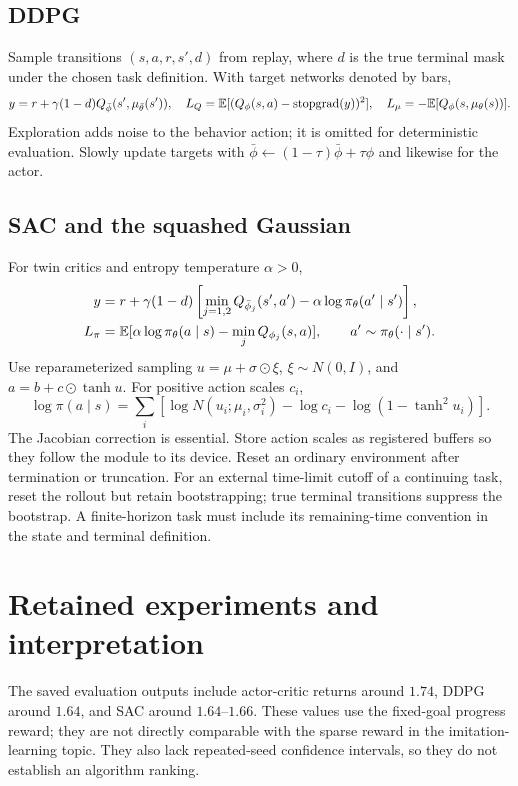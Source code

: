 \subsection{DDPG}
Sample transitions $(s,a,r,s',d)$ from replay, where $d$ is the true terminal
mask under the chosen task definition. With target networks denoted by bars,
\[
 y=r+\gamma(1-d)Q_{\bar\phi}(s',\mu_{\bar\theta}(s')),
 \quad L_Q=\mathbb{E}[(Q_\phi(s,a)-\operatorname{stopgrad}(y))^2],
 \quad L_\mu=-\mathbb{E}[Q_\phi(s,\mu_\theta(s))].
\]
Exploration adds noise to the behavior action; it is omitted for deterministic
evaluation. Slowly update targets with
$\bar\phi\leftarrow(1-\tau)\bar\phi+\tau\phi$ and likewise for the actor.

\subsection{SAC and the squashed Gaussian}
For twin critics and entropy temperature $\alpha>0$,
\begin{align*}
 y&=r+\gamma(1-d)
  \left[\min_{j=1,2}Q_{\bar\phi_j}(s',a')-\alpha\log\pi_\theta(a'\mid s')\right],\\
 L_{\pi}&=\mathbb{E}[\alpha\log\pi_\theta(a\mid s)-\min_jQ_{\phi_j}(s,a)],
 \qquad a'\sim\pi_\theta(\cdot\mid s').
\end{align*}
Use reparameterized sampling $u=\mu+\sigma\odot\xi$, $\xi\sim N(0,I)$,
and $a=b+c\odot\tanh u$. For positive action scales $c_i$,
\[
 \log\pi(a\mid s)=\sum_i\left[
    \log N(u_i;\mu_i,\sigma_i^2)-\log c_i-\log(1-\tanh^2u_i)\right].
\]
The Jacobian correction is essential. Store action scales as registered
buffers so they follow the module to its device. Reset an ordinary environment
after termination or truncation. For an external time-limit cutoff of a
continuing task, reset the rollout but retain bootstrapping; true terminal
transitions suppress the bootstrap. A finite-horizon task must include its
remaining-time convention in the state and terminal definition.

\newpage
\section{Retained experiments and interpretation}
\historical
The saved evaluation outputs include actor-critic returns around $1.74$,
DDPG around $1.64$, and SAC around $1.64$--$1.66$. These values use the
fixed-goal progress reward; they are not directly comparable with the sparse
reward in the imitation-learning topic. They also lack repeated-seed
confidence intervals, so they do not establish an algorithm ranking.

